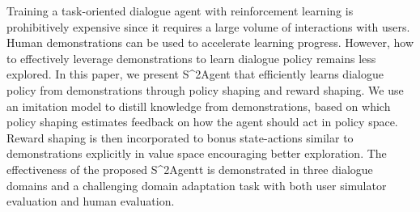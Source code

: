 Training a task-oriented dialogue agent with reinforcement learning is prohibitively expensive since it requires a large volume of interactions with users. Human demonstrations can be used to accelerate learning progress. However, how to effectively leverage demonstrations to learn dialogue policy remains less explored. In this paper, we present S{\^{}}2Agent that efficiently learns dialogue policy from demonstrations through policy shaping and reward shaping. We use an imitation model to distill knowledge from demonstrations, based on which policy shaping estimates feedback on how the agent should act in policy space. Reward shaping is then incorporated to bonus state-actions similar to demonstrations explicitly in value space encouraging better exploration. The effectiveness of the proposed S{\^{}}2Agentt is demonstrated in three dialogue domains and a challenging domain adaptation task with both user simulator evaluation and human evaluation.
